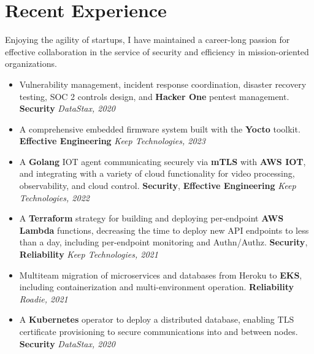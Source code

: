 \documentclass[letterpaper,10pt]{article}
\begin{document}

\section{Recent Experience}
Enjoying the agility of startups, I have maintained a career-long passion for
effective collaboration in the service of security and efficiency in
mission-oriented organizations.
\begin{itemize}
	\item Vulnerability management, incident response coordination, disaster recovery testing, SOC 2 controls design, and \textbf{Hacker One} pentest management. \textbf{Security} \textit{DataStax, 2020}
	      \setlength\itemsep{0.1em} \item A comprehensive embedded firmware system
	      built with the \textbf{Yocto} toolkit. \textbf{Effective Engineering} \textit{Keep Technologies, 2023}
	\item A \textbf{Golang} IOT agent communicating securely via \textbf{mTLS} with \textbf{AWS IOT}, and integrating with a variety of cloud functionality for video processing, observability, and cloud control. \textbf{Security}, \textbf{Effective Engineering} \textit{Keep Technologies, 2022}
	\item A \textbf{Terraform} strategy for building and deploying per-endpoint \textbf{AWS Lambda} functions, decreasing the time to deploy new API endpoints to less than a day, including per-endpoint monitoring and Authn/Authz. \textbf{Security}, \textbf{Reliability} \textit{Keep Technologies, 2021}
	\item Multiteam migration of microservices and databases from Heroku to \textbf{EKS}, including containerization and multi-environment operation. \textbf{Reliability} \textit{Roadie, 2021}
	\item A \textbf{Kubernetes} operator to deploy a distributed database, enabling TLS certificate provisioning to secure communications into and between nodes. \textbf{Security} \textit{DataStax, 2020}
\end{itemize}
\end{document}
